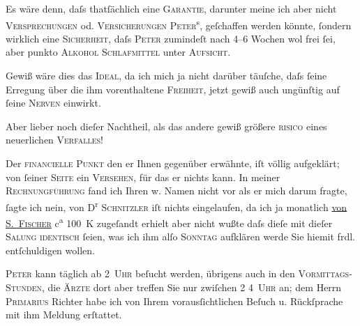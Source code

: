 \pstart
           Es wäre denn, daſs thatſächlich eine \textsc{Garantie}, darunter
               meine ich aber nicht \textsc{Versprechungen} od. \textsc{Versicherungen}{ }\textsc{Peter}\textsuperscript{s}, geſchaffen werden {\pb}könnte, ſondern wirklich eine \textsc{Sicherheit}, daſs \textsc{Peter} zumindeſt nach 4–6 Wochen wol frei ſei, aber punkto \textsc{Alkohol}{ }{\kaufmannsund}{ }\textsc{Schlafmittel} unter \textsc{Aufsicht}.\pend
           
\pstart
           Gewiß wäre dies das \textsc{Ideal}, da ich mich ja nicht darüber
               täuſche, daſs ſeine Erregung über die ihm vorenthaltene \textsc{Freiheit}, jetzt gewiß auch ungünſtig auf ſeine \textsc{Nerven} einwirkt.\pend
           
\pstart
           Aber lieber noch dieſer {\pb}Nachtheil, als das andere {\kaufmannsund} gewiß größere \textsc{risico} eines
               neuerlichen \textsc{Verfalles}!\pend
           
\pstart
           Der \textsc{financielle Punkt} den er Ihnen gegenüber erwähnte, iſt
               völlig aufgeklärt; von ſeiner \textsc{Seite} ein \textsc{Versehen}, für das er nichts kann. In meiner \textsc{Rechnungführung} fand ich Ihren w. Namen nicht vor {\kaufmannsund} als er mich darum fragte, ſagte ich nein, von D\textsuperscript{r}{ }\textsc{Schnitzler}{ }{\pb}iſt nichts eingelaufen, da ich ja monatlich \uline{von \textsc{S. Fischer}} c\textsuperscript{a} 100 K zugeſandt erhielt aber nicht wußte daſs
               dieſe mit dieſer \textsc{Sa{\geminationm}lung
                  identisch} ſeien, was ich ihm alſo \textsc{Sonntag} aufklären werde {\kaufmannsund} Sie hiemit frdl. entſchuldigen
               wollen.\pend
           
\pstart
           \textsc{Peter} kann täglich ab 2 \textsc{Uhr} beſucht werden, übrigens auch
               in den \textsc{Vormittags-Stunden}, die \textsc{Ärzte} dort aber {\pb}treffen Sie nur zwiſchen 2
                  {\kaufmannsund} 4 \textsc{Uhr} an; dem Herrn \textsc{Primarius}{ }Richter habe ich von Ihrem vorausſichtlichen
               Beſuch u. Rückſprache mit ihm Meldung erſtattet.\pend
           
